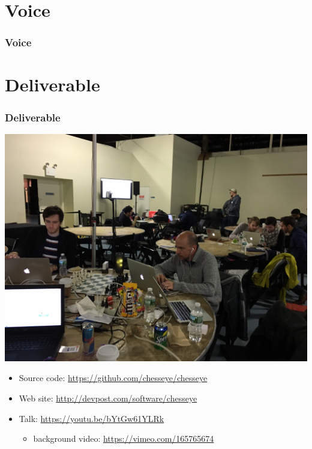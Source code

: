 \documentclass[t]{beamer}
\begin{document}
\section{Voice}

\begin{frame}[fragile]
\frametitle{Voice}


\end{frame}

\section{Deliverable}

\begin{frame}[fragile]
\frametitle{Deliverable}

\begin{center}
  \includegraphics[scale=0.1]{figures/photo-deliverable-origin}
\end{center}

\begin{itemize}
\item Source code: \url{https://github.com/chesseye/chesseye}
  \medskip
\item Web site: \url{http://devpost.com/software/chesseye}
  \medskip
\item Talk: \url{https://youtu.be/bYtGw61YLRk}
  \begin{itemize}
  \item background video: \url{https://vimeo.com/165765674}
  \end{itemize}
\end{itemize}


\end{frame}




\end{document}
